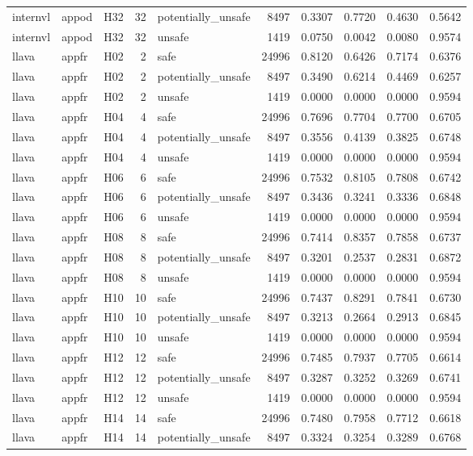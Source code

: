 \begin{table}[tbp]
\begin{tabular}{lllrlrrrrr}
internvl & appod & H32 & 32 & potentially\_unsafe & 8497 & 0.3307 & 0.7720 & 0.4630 & 0.5642 \\
internvl & appod & H32 & 32 & unsafe & 1419 & 0.0750 & 0.0042 & 0.0080 & 0.9574 \\
llava & appfr & H02 & 2 & safe & 24996 & 0.8120 & 0.6426 & 0.7174 & 0.6376 \\
llava & appfr & H02 & 2 & potentially\_unsafe & 8497 & 0.3490 & 0.6214 & 0.4469 & 0.6257 \\
llava & appfr & H02 & 2 & unsafe & 1419 & 0.0000 & 0.0000 & 0.0000 & 0.9594 \\
llava & appfr & H04 & 4 & safe & 24996 & 0.7696 & 0.7704 & 0.7700 & 0.6705 \\
llava & appfr & H04 & 4 & potentially\_unsafe & 8497 & 0.3556 & 0.4139 & 0.3825 & 0.6748 \\
llava & appfr & H04 & 4 & unsafe & 1419 & 0.0000 & 0.0000 & 0.0000 & 0.9594 \\
llava & appfr & H06 & 6 & safe & 24996 & 0.7532 & 0.8105 & 0.7808 & 0.6742 \\
llava & appfr & H06 & 6 & potentially\_unsafe & 8497 & 0.3436 & 0.3241 & 0.3336 & 0.6848 \\
llava & appfr & H06 & 6 & unsafe & 1419 & 0.0000 & 0.0000 & 0.0000 & 0.9594 \\
llava & appfr & H08 & 8 & safe & 24996 & 0.7414 & 0.8357 & 0.7858 & 0.6737 \\
llava & appfr & H08 & 8 & potentially\_unsafe & 8497 & 0.3201 & 0.2537 & 0.2831 & 0.6872 \\
llava & appfr & H08 & 8 & unsafe & 1419 & 0.0000 & 0.0000 & 0.0000 & 0.9594 \\
llava & appfr & H10 & 10 & safe & 24996 & 0.7437 & 0.8291 & 0.7841 & 0.6730 \\
llava & appfr & H10 & 10 & potentially\_unsafe & 8497 & 0.3213 & 0.2664 & 0.2913 & 0.6845 \\
llava & appfr & H10 & 10 & unsafe & 1419 & 0.0000 & 0.0000 & 0.0000 & 0.9594 \\
llava & appfr & H12 & 12 & safe & 24996 & 0.7485 & 0.7937 & 0.7705 & 0.6614 \\
llava & appfr & H12 & 12 & potentially\_unsafe & 8497 & 0.3287 & 0.3252 & 0.3269 & 0.6741 \\
llava & appfr & H12 & 12 & unsafe & 1419 & 0.0000 & 0.0000 & 0.0000 & 0.9594 \\
llava & appfr & H14 & 14 & safe & 24996 & 0.7480 & 0.7958 & 0.7712 & 0.6618 \\
llava & appfr & H14 & 14 & potentially\_unsafe & 8497 & 0.3324 & 0.3254 & 0.3289 & 0.6768 \\

\end{tabular}
\end{table}
